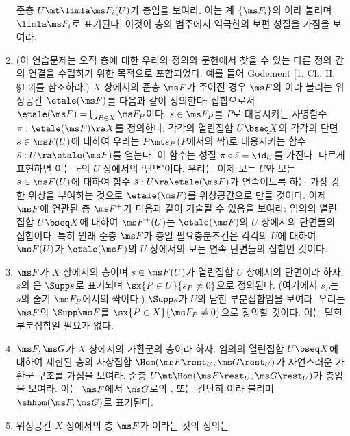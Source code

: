 \begin{enumerate}[label=\tb{1.\arabic*.},itemindent=0mm,itemsep=2mm]
	준층 $U\mt\limla\ms F_i(U)$가 층임을 보여라. 이는 계 $\{\ms F_i\}$의 이라 불리며
	$\limla\ms F_i$로 표기된다. 이것이 층의 범주에서 역극한의 보편 성질을 가짐을 보여라.
	\item {}
	(이 연습문제는 오직 층에 대한 우리의 정의와 문헌에서 찾을 수 있는 다른 정의 간의 연결을 수립하기 위한 목적으로 포함되었다.
	예를 들어 Godement [1, Ch. II, \S 1.2]를 참조하라.)
	$X$ 상에서의 준층 $\ms F$가 주어진 경우 $\ms F$의 이라 불리는
	위상공간 $\etale(\ms F)$를 다음과 같이 정의한다: 집합으로서 $\etale(\ms F)=\bigcup_{P\in X}\ms F_P$이다.
	$s\in\ms F_P$를 $P$로 대응시키는 사영함수 $\pi:\etale(\ms F)\ra X$를 정의한다.
	각각의 열린집합 $U\bseq X$와 각각의 단면 $s\in\ms F(U)$에 대하여 우리는 $P\mt s_P$($P$에서의 싹)로 대응시키는
	함수 $\bar s:U\ra\etale(\ms F)$를 얻는다.
	이 함수는 성질 $\pi\circ\bar s=\id_U$를 가진다. 다르게 표현하면 이는 $\pi$의 $U$ 상에서의 `단면'이다.
	우리는 이제 모든 $U$와 모든 $s\in\ms F(U)$에 대하여 함수 $\bar s:U\ra\etale(\ms F)$가 연속이도록 하는
	가장 강한 위상을 부여하는 것으로 $\etale(\ms F)$를 위상공간으로 만들 것이다.
	이제 $\ms F$에 연관된 층 $\ms F^+$가 다음과 같이 기술될 수 있음을 보여라:
	임의의 열린집합 $U\bseq X$에 대하여 $\ms F^+(U)$는 $\etale(\ms F)$의 $U$ 상에서의  단면들의 집합이다.
	특히 원래 준층 $\ms F$가 층일 필요충분조건은 각각의 $U$에 대하여 $\ms F(U)$가
	$\etale(\ms F)$의 $U$ 상에서의 모든 연속 단면들의 집합인 것이다.
	\item {} $\ms F$가 $X$ 상에서의 층이며 $s\in\ms F(U)$가 열린집합 $U$ 상에서의 단면이라 하자.
	$s$의 은 $\Supp s$로 표기되며 $\sx{P\in U}{s_P\ne 0}$으로 정의된다.
	(여기에서 $s_P$는 $s$의 줄기 $\ms F_P$에서의 싹이다.) $\Supp s$가 $U$의 닫힌 부분집합임을 보여라.
	우리는 $\ms F$의  $\Supp\ms F$를 $\sx{P\in X}{\ms F_P\ne 0}$으로 정의할 것이다.
	이는 닫힌 부분집합일 필요가 없다.
	\item {} $\ms F,\ms G$가 $X$ 상에서의 가환군의 층이라 하자.
	임의의 열린집합 $U\bseq X$에 대하여 제한된 층의 사상집합 $\Hom(\ms F\rest_U,\ms G\rest_U)$가
	자연스러운 가환군 구조를 가짐을 보여라. 준층 $U\mt\Hom(\ms F\rest_U,\ms G\rest_U)$가 층임을 보여라.
	이는 $\ms F$에서 $\ms G$로의 ,
	또는 간단히 이라 불리며 $\shhom(\ms F,\ms G)$로 표기된다.
	\item {} 위상공간 $X$ 상에서의 층 $\ms F$가 이라는 것의 정의는

\end{enumerate}
